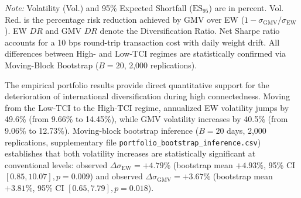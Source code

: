 \documentclass[12pt,a4paper]{article}
\begin{document}
\begin{table}[H]
\centering
\caption{Portfolio risk and diversification breakdown across connectedness regimes}
\label{tab:portfolio}
\begin{minipage}{0.95\textwidth}
\footnotesize\textit{Note:} Volatility (Vol.) and 95\% Expected Shortfall ($\text{ES}_{95}$) are in percent. Vol. Red. is the percentage risk reduction achieved by GMV over EW ($1 - \sigma_{\text{GMV}}/\sigma_{\text{EW}}$). EW $DR$ and GMV $DR$ denote the \citet{ChoueifatyCoignard2008} Diversification Ratio. Net Sharpe ratio accounts for a 10 bps round-trip transaction cost with daily weight drift. All differences between High- and Low-TCI regimes are statistically confirmed via Moving-Block Bootstrap ($B=20$, 2,000 replications).
\end{minipage}
\end{table}

The empirical portfolio results provide direct quantitative support for the deterioration of international diversification during high connectedness. Moving from the Low-TCI to the High-TCI regime, annualized EW volatility jumps by 49.6\% (from 9.66\% to 14.45\%), while GMV volatility increases by 40.5\% (from 9.06\% to 12.73\%). Moving-block bootstrap inference ($B=20$ days, 2,000 replications, supplementary file \texttt{portfolio\_bootstrap\_inference.csv}) establishes that both volatility increases are statistically significant at conventional levels: observed $\Delta \sigma_{\text{EW}} = +4.79\%$ (bootstrap mean $+4.93\%$, 95\% CI $[0.85, 10.07], p = 0.009$) and observed $\Delta \sigma_{\text{GMV}} = +3.67\%$ (bootstrap mean $+3.81\%$, 95\% CI $[0.65, 7.79], p = 0.018$). 
\end{document}
